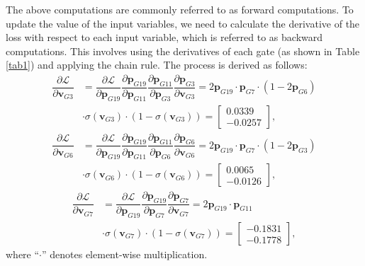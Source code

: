 The above computations are commonly referred to as forward computations. To update the value of the input variables, we need to calculate the derivative of the loss with respect to each input variable, which is referred to as backward computations. This involves using the derivatives of each gate (as shown in Table \ref{tab1}) and applying the chain rule. The process is derived as follows:
\begin{align}
    \dfrac{\partial \mathcal{L}}{\partial \textbf{v}_{G3}} &= \dfrac{\partial \mathcal{L}}{\partial \textbf{p}_{G19}} \dfrac{\partial \textbf{p}_{G19}}{\partial \textbf{p}_{G11}} \dfrac{\partial \textbf{p}_{G11}} {\partial \textbf{p}_{G3}}
    \dfrac{\partial \textbf{p}_{G3}} {\partial \textbf{v}_{G3}} = 2\textbf{p}_{G19} \cdot \textbf{p}_{G7} \cdot (1 - 2\textbf{p}_{G6}) \nonumber \\ 
    &\cdot \sigma(\textbf{v}_{G3})\cdot (1 - \sigma(\textbf{v}_{G3})) = \begin{bmatrix}
           0.0339  \\
           -0.0257 
         \end{bmatrix}, \nonumber 
\end{align}
\begin{align}
    \dfrac{\partial \mathcal{L}}{\partial \textbf{v}_{G6}} &= \dfrac{\partial \mathcal{L}}{\partial \textbf{p}_{G19}} \dfrac{\partial \textbf{p}_{G19}}{\partial \textbf{p}_{G11}} \dfrac{\partial \textbf{p}_{G11}} {\partial \textbf{p}_{G6}}
    \dfrac{\partial \textbf{p}_{G6}} {\partial \textbf{v}_{G6}} = 2\textbf{p}_{G19} \cdot \textbf{p}_{G7} \cdot (1 - 2\textbf{p}_{G3})  \nonumber 
 \\ 
    & \cdot \sigma(\textbf{v}_{G6}) \cdot (1 - \sigma(\textbf{v}_{G6}))  = \begin{bmatrix}
           0.0065   \\
           -0.0126 
         \end{bmatrix}, \nonumber 
\end{align}
\begin{align}
    \dfrac{\partial \mathcal{L}}{\partial \textbf{v}_{G7}} &= \dfrac{\partial \mathcal{L}}{\partial \textbf{p}_{G19}} \dfrac{\partial \textbf{p}_{G19}}{\partial \textbf{p}_{G7}} \dfrac{\partial \textbf{p}_{G7}} {\partial \textbf{v}_{G7}} = 2\textbf{p}_{G19} \cdot \textbf{p}_{G11} \nonumber 
 \\ 
    & \cdot \sigma(\textbf{v}_{G7})\cdot (1 - \sigma(\textbf{v}_{G7})) = \begin{bmatrix}
           -0.1831   \\
           -0.1778 
         \end{bmatrix},
\end{align}
where ``$\cdot$'' denotes element-wise multiplication.


